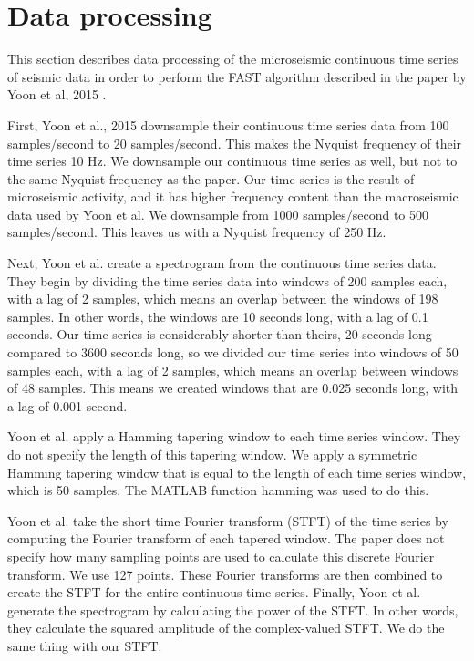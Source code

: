 \section{Data processing}
This section describes data processing of the microseismic continuous time series of seismic data in order to perform the FAST algorithm described in the paper by Yoon et al, 2015 \cite{yoon2015earthquake}. 

First, Yoon et al., 2015 downsample their continuous time series data from 100 samples/second to 20 samples/second. This makes the Nyquist frequency of their time series 10 Hz. We downsample our continuous time series as well, but not to the same Nyquist frequency as the paper. Our time series is the result of microseismic activity, and it has higher frequency content than the macroseismic data used by Yoon et al. We downsample from 1000 samples/second to 500 samples/second. This leaves us with a Nyquist frequency of 250 Hz. 

Next, Yoon et al. create a spectrogram from the continuous time series data. They begin by dividing the time series data into windows of 200 samples each, with a lag of 2 samples, which means an overlap between the windows of 198 samples. In other words, the windows are 10 seconds long, with a lag of 0.1 seconds. Our time series is considerably shorter than theirs, 20 seconds long compared to 3600 seconds long, so we divided our time series into windows of 50 samples each, with a lag of 2 samples, which means an overlap between windows of 48 samples. This means we created windows that are 0.025 seconds long, with a lag of 0.001 second. 

Yoon et al. apply a Hamming tapering window to each time series window. They do not specify the length of this tapering window. We apply a symmetric Hamming tapering window that is equal to the length of each time series window, which is 50 samples. The MATLAB function hamming was used to do this.

Yoon et al. take the short time Fourier transform (STFT) of the time series by computing the Fourier transform of each tapered window. The paper does not specify how many sampling points are used to calculate this discrete Fourier transform. We use 127 points. These Fourier transforms are then combined to create the STFT for the entire continuous time series.
Finally, Yoon et al. generate the spectrogram by calculating the power of the STFT. In other words, they calculate the squared amplitude of the complex-valued STFT. We do the same thing with our STFT.

